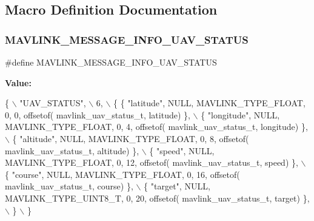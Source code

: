 \subsection{Macro Definition Documentation}
\mbox{\label{mavlink__msg__uav__status_8h_a9d258abf968fa664f22d563cc63c7424}} 
\subsubsection{M\+A\+V\+L\+I\+N\+K\+\_\+\+M\+E\+S\+S\+A\+G\+E\+\_\+\+I\+N\+F\+O\+\_\+\+U\+A\+V\+\_\+\+S\+T\+A\+T\+US}
{\footnotesize\ttfamily \#define M\+A\+V\+L\+I\+N\+K\+\_\+\+M\+E\+S\+S\+A\+G\+E\+\_\+\+I\+N\+F\+O\+\_\+\+U\+A\+V\+\_\+\+S\+T\+A\+T\+US}

{\bfseries Value\+:}
\begin{DoxyCode}
\{ \(\backslash\)
    \textcolor{stringliteral}{"UAV\_STATUS"}, \(\backslash\)
    6, \(\backslash\)
    \{  \{ \textcolor{stringliteral}{"latitude"}, NULL, MAVLINK_TYPE_FLOAT, 0, 0, offsetof(
      mavlink_uav_status_t, latitude) \}, \(\backslash\)
         \{ \textcolor{stringliteral}{"longitude"}, NULL, MAVLINK_TYPE_FLOAT, 0, 4, offsetof(
      mavlink_uav_status_t, longitude) \}, \(\backslash\)
         \{ \textcolor{stringliteral}{"altitude"}, NULL, MAVLINK_TYPE_FLOAT, 0, 8, offsetof(
      mavlink_uav_status_t, altitude) \}, \(\backslash\)
         \{ \textcolor{stringliteral}{"speed"}, NULL, MAVLINK_TYPE_FLOAT, 0, 12, offsetof(
      mavlink_uav_status_t, speed) \}, \(\backslash\)
         \{ \textcolor{stringliteral}{"course"}, NULL, MAVLINK_TYPE_FLOAT, 0, 16, offsetof(
      mavlink_uav_status_t, course) \}, \(\backslash\)
         \{ \textcolor{stringliteral}{"target"}, NULL, MAVLINK_TYPE_UINT8_T, 0, 20, offsetof(
      mavlink_uav_status_t, target) \}, \(\backslash\)
         \} \(\backslash\)
\}
\end{DoxyCode}
\mbox{\label{mavlink__msg__uav__status_8h_a0b034917676f25c18099845060fb48b5}} 
